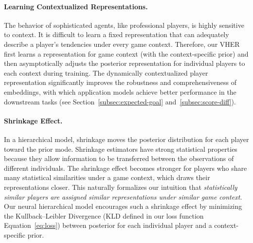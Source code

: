 \documentclass{article}
\begin{document}
\paragraph{Learning Contextualized Representations.} 
The behavior of sophisticated agents, like professional players, is highly sensitive to context. 
It is difficult to learn a fixed representation that can adequately describe a player's tendencies under every game context. 
Therefore, our VHER first learns a representation for game context (with the context-specific prior) and then asymptotically adjusts the posterior representation for individual players to each context during training.
The dynamically contextualized player representation significantly improves the robustness and comprehensiveness of embeddings, with which application models achieve better performance in the downstream tasks (see Section~\ref{subsec:expected-goal} and~\ref{subsec:score-diff}). 


\paragraph{Shrinkage Effect.} 
In a hierarchical model, shrinkage moves the posterior distribution for each player toward the prior mode. 
Shrinkage estimators have strong statistical properties because they allow information to be transferred between the observations of different individuals. 
The shrinkage effect becomes stronger for players who share many statistical similarities under a game context, which %
draws their representations closer.
This naturally formalizes our intuition that {\em statistically similar players are assigned similar representations under similar game context.}
Our neural hierarchical model encourages such a shrinkage effect by minimizing the Kullback–Leibler Divergence (KLD defined in our loss function Equation~\eqref{eq:loss}) between posterior for each individual player and a context-specific prior. 
\end{document}
